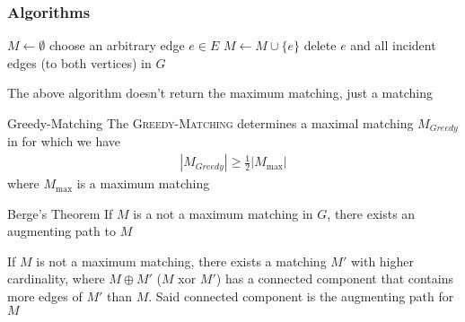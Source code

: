 \subsubsection{Algorithms}
\begin{algorithm}
    \caption{\textsc{Greedy-Matching}$(G)$}
    \begin{algorithmic}[1]
        \State $M \gets \emptyset$
            \State choose an arbitrary edge $e \in E$ 
            \State $M \gets M \cup \{e\}$
            \State delete $e$ and all incident edges (to both vertices) in $G$
        \EndWhile
    \end{algorithmic}
\end{algorithm}
The above algorithm doesn't return the maximum matching, just a matching
\begin{theorem}[]{Greedy-Matching}
    The \textsc{Greedy-Matching} determines a maximal matching $M_{Greedy}$ in  for which we have
    \begin{align*}
        |M_{Greedy}| \geq \frac{1}{2} |M_{\max}|
    \end{align*}
    where $M_{\max}$ is a maximum matching
\end{theorem}

\begin{theorem}[]{Berge's Theorem}
    If $M$ is a not a maximum matching in $G$, there exists an augmenting path to $M$
\end{theorem}
\inlineproof If $M$ is not a maximum matching, there exists a matching $M'$ with higher cardinality, where $M \oplus M'$ ($M$ xor $M'$) has a connected component that contains more edges of $M'$ than $M$. Said connected component is the augmenting path for $M$

